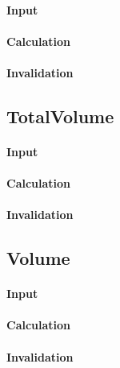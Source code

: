 \paragraph{Input}

\paragraph{Calculation}

\paragraph{Invalidation}

\bigskip

\subsection{TotalVolume}

\paragraph{Input}

\paragraph{Calculation}

\paragraph{Invalidation}

\bigskip

\subsection{Volume}

\paragraph{Input}

\paragraph{Calculation}

\paragraph{Invalidation}

\bigskip

